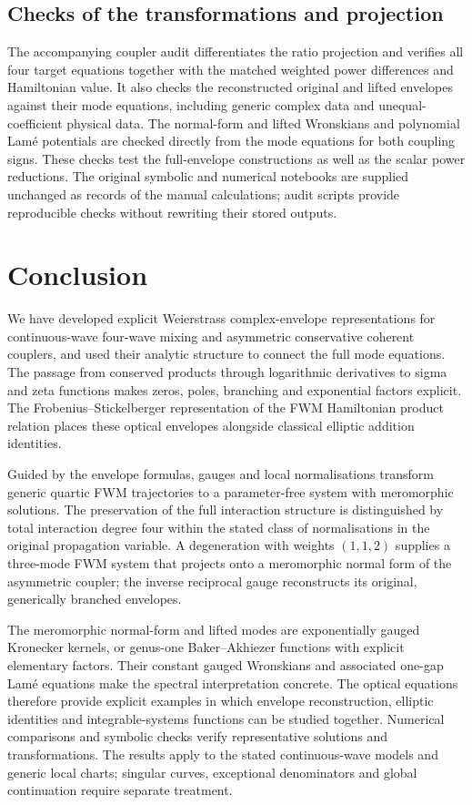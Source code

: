 \documentclass[11pt,a4paper]{article}
\numberwithin{equation}{section}
\begin{document}
\subsection{Checks of the transformations and projection}
The accompanying coupler audit differentiates the ratio projection and verifies all four target equations together with the matched weighted power differences and Hamiltonian value.
It also checks the reconstructed original and lifted envelopes against their mode equations, including generic complex data and unequal-coefficient physical data.
The normal-form and lifted Wronskians and polynomial Lam\'e potentials are checked directly from the mode equations for both coupling signs.
These checks test the full-envelope constructions as well as the scalar power reductions.
The original symbolic and numerical notebooks are supplied unchanged as records of the manual calculations; audit scripts provide reproducible checks without rewriting their stored outputs.

\FloatBarrier
\section{Conclusion}
We have developed explicit Weierstrass complex-envelope representations for continuous-wave four-wave mixing and asymmetric conservative coherent couplers, and used their analytic structure to connect the full mode equations.
The passage from conserved products through logarithmic derivatives to sigma and zeta functions makes zeros, poles, branching and exponential factors explicit.
The Frobenius--Stickelberger representation of the FWM Hamiltonian product relation places these optical envelopes alongside classical elliptic addition identities.

Guided by the envelope formulas, gauges and local normalisations transform generic quartic FWM trajectories to a parameter-free system with meromorphic solutions.
The preservation of the full interaction structure is distinguished by total interaction degree four within the stated class of normalisations in the original propagation variable.
A degeneration with weights $(1,1,2)$ supplies a three-mode FWM system that projects onto a meromorphic normal form of the asymmetric coupler; the inverse reciprocal gauge reconstructs its original, generically branched envelopes.

The meromorphic normal-form and lifted modes are exponentially gauged Kronecker kernels, or genus-one Baker--Akhiezer functions with explicit elementary factors.
Their constant gauged Wronskians and associated one-gap Lam\'e equations make the spectral interpretation concrete.
The optical equations therefore provide explicit examples in which envelope reconstruction, elliptic identities and integrable-systems functions can be studied together.
Numerical comparisons and symbolic checks verify representative solutions and transformations.
The results apply to the stated continuous-wave models and generic local charts; singular curves, exceptional denominators and global continuation require separate treatment.
\end{document}
